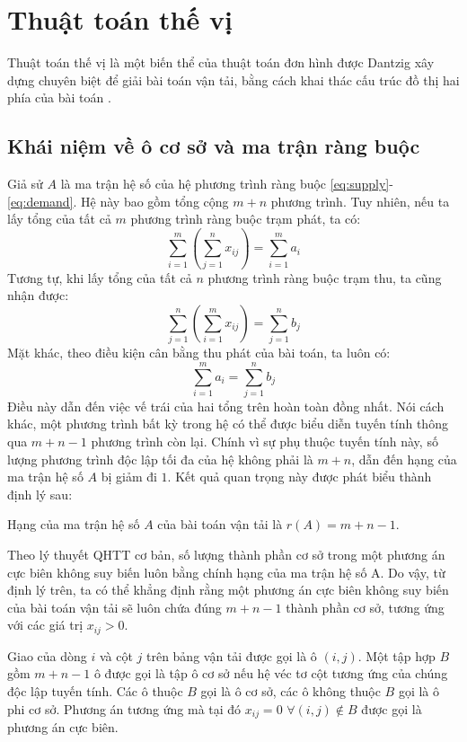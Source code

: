 \documentclass[../main.tex]{subfiles}
\begin{document}
\chapter{Thuật toán thế vị}

Thuật toán thế vị là một biến thể của thuật toán đơn hình được Dantzig xây dựng chuyên biệt để giải bài toán vận tải, bằng cách khai thác cấu trúc đồ thị hai phía của bài toán \cite{dantzig1951}.

\section{Khái niệm về ô cơ sở và ma trận ràng buộc}
    
Giả sử $A$ là ma trận hệ số của hệ phương trình ràng buộc \eqref{eq:supply}-\eqref{eq:demand}. Hệ này bao gồm tổng cộng $m+n$ phương trình. Tuy nhiên, nếu ta lấy tổng của tất cả $m$ phương trình ràng buộc trạm phát, ta có:
\[ \sum_{i=1}^{m} \left( \sum_{j=1}^{n} x_{ij} \right) = \sum_{i=1}^{m} a_i \]
Tương tự, khi lấy tổng của tất cả $n$ phương trình ràng buộc trạm thu, ta cũng nhận được:
\[ \sum_{j=1}^{n} \left( \sum_{i=1}^{m} x_{ij} \right) = \sum_{j=1}^{n} b_j \]
Mặt khác, theo điều kiện cân bằng thu phát của bài toán, ta luôn có:
\[ \sum_{i=1}^{m} a_i = \sum_{j=1}^{n} b_j \]
Điều này dẫn đến việc vế trái của hai tổng trên hoàn toàn đồng nhất. Nói cách khác, một phương trình bất kỳ trong hệ có thể được biểu diễn tuyến tính thông qua $m+n-1$ phương trình còn lại. Chính vì sự phụ thuộc tuyến tính này, số lượng phương trình độc lập tối đa của hệ không phải là $m+n$, dẫn đến hạng của ma trận hệ số $A$ bị giảm đi $1$. Kết quả quan trọng này được phát biểu thành định lý sau:
    
\begin{theorem}
    Hạng của ma trận hệ số $A$ của bài toán vận tải là $r(A) = m + n - 1$.
\end{theorem}
    
Theo lý thuyết QHTT cơ bản, số lượng thành phần cơ sở trong một phương án cực biên không suy biến luôn bằng chính hạng của ma trận hệ số A. Do vậy, từ định lý trên, ta có thể khẳng định rằng một phương án cực biên không suy biến của bài toán vận tải sẽ luôn chứa đúng $m+n-1$ thành phần cơ sở, tương ứng với các giá trị $x_{ij} > 0$.
\begin{definition}
    Giao của dòng $i$ và cột $j$ trên bảng vận tải được gọi là ô $(i,j)$.
    Một tập hợp $B$ gồm $m+n-1$ ô được gọi là tập ô cơ sở nếu hệ véc tơ cột tương ứng của chúng độc lập tuyến tính. Các ô thuộc $B$ gọi là ô cơ sở, các ô không thuộc $B$ gọi là ô phi cơ sở.
    Phương án tương ứng mà tại đó $x_{ij} = 0 \,\, \forall (i,j) \notin B$ được gọi là phương án cực biên.
\end{definition}
\end{document}
